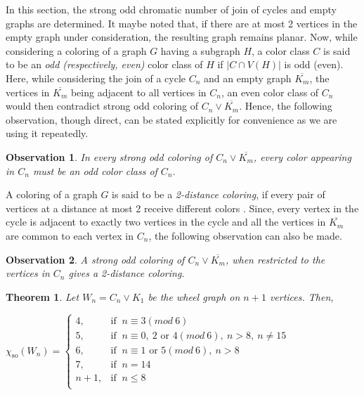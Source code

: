 \documentclass[12pt,a4paper]{article}
\newtheorem{theorem}{Theorem}
\newtheorem{observation}{Observation}
\theoremstyle{definition}
\numberwithin{equation}{section}
\begin{document}
In this section, the strong odd chromatic number of join of cycles and empty graphs are determined. It maybe noted that, if there are at most 2 vertices in the empty graph under consideration, the resulting graph remains planar.  Now, while considering a coloring of a graph $G$ having a subgraph $H$, a color class $C$ is said to be an \textit{odd (respectively, even)} color class of $H$ if $|C \cap V(H)|$ is odd (even). Here, while considering the join of a cycle $C_n$ and an empty graph $\overline{K_m}$, the vertices in $\overline{K_m}$ being adjacent to all vertices in $C_n$, an even color class of $C_n$ would then contradict strong odd coloring of $C_n \vee \overline{K_m}$. Hence, the following observation, though direct, can be stated explicitly for convenience as we are using it repeatedly. 
\begin{observation} \label{H odd}
    In every strong odd coloring of $C_n \vee \overline{K_m}$, every color appearing in $C_n$ must be an odd color class of $C_n$.
\end{observation}

  A coloring of a graph $G$ is said to be a \textit{2-distance coloring}, if every pair of vertices at a distance at most 2 receive different colors \cite{Wegner}. Since, every vertex in the cycle is adjacent to exactly two vertices in the cycle and all the vertices in $\overline{K_m}$ are common to each vertex in $C_n$, the following observation can also be made. 

\begin{observation} \label{d>2}
    A strong odd coloring of $C_n \vee \overline{K_m}$, when restricted to the vertices in $C_n$ gives a 2-distance coloring.
\end{observation}

\begin{theorem} \label{wheels}
Let $W_n = C_n \vee K_1$ be the \textit{wheel graph} on $n+1$ vertices. Then,

    $\chi_{\text{so}}(W_n) = \begin{cases}
  4, & \text{if }~ n \equiv 3(mod~6)\\
  5,  & \text{if }~n \equiv 0, ~2 \text{ or }4(mod~6), ~n>8,~ n\neq15\\
  6,  & \text{if }~ n \equiv 1 \text{ or }5(mod~6), ~n>8\\
  7, & \text{if }~ n = 14\\
  n+1, & \text{if }~ n \leq 8\\  
\end{cases}$
\end{theorem}
\end{document}
